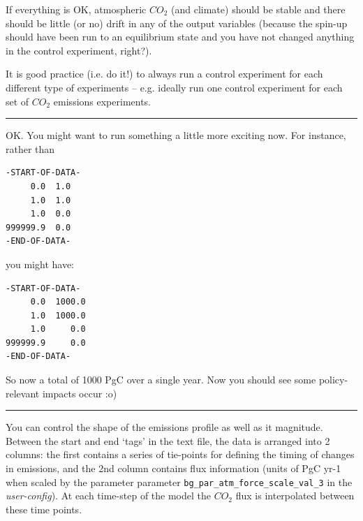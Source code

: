 \documentclass[11pt,fleqn]{book} %
\begin{document}
If everything is OK, atmospheric \(CO_{2}\) (and climate) should be stable and there should be little (or no) drift in any of the output variables (because the spin-up should have been run to an equilibrium state and you have not changed anything in the control experiment, right?).

It is good practice (i.e. do it!) to always run a control experiment for each different type of experiments – e.g. ideally run one control experiment for each set of \(CO_{2}\) emissions experiments. 

\vspace{1mm}
\noindent\rule{4cm}{0.1mm}
\vspace{2mm}

\noindent OK. You might want to run something a little more exciting now. For instance, rather than
\vspace{-2pt}\begin{verbatim}
-START-OF-DATA-
     0.0  1.0 
     1.0  1.0
     1.0  0.0
999999.9  0.0
-END-OF-DATA-
\end{verbatim}\vspace{-2pt}
you might have: 
\vspace{-2pt}\begin{verbatim}
-START-OF-DATA-
     0.0  1000.0 
     1.0  1000.0
     1.0     0.0
999999.9     0.0
-END-OF-DATA-
\end{verbatim}\vspace{-2pt}
So now a total of 1000 PgC over a single year. Now you should see some policy-relevant impacts occur :o) 

\vspace{1mm}
\noindent\rule{4cm}{0.1mm}
\vspace{2mm}

You can control the shape of the emissions profile as well as it magnitude. Between the start and end ‘tags’ in the text file, the data is arranged into 2 columns: the first contains a series of tie-points for defining the timing of changes in emissions, and the 2nd column contains flux information (units of PgC yr-1 when scaled by the parameter parameter \texttt{bg\_par\_atm\_force\_scale\_val\_3} in the \textit{user-config}). At each time-step of the model the \(CO_{2}\) flux is interpolated between these time points.
\end{document}
